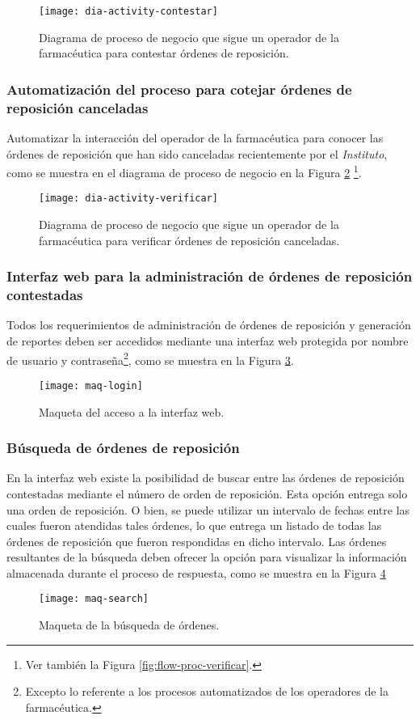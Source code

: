 \begin{figure}[h]
  \centering
  \texttt{[image: dia-activity-contestar]}
  \caption{Diagrama de proceso de negocio que sigue un operador de la farmacéutica para contestar órdenes de reposición.}
  \label{fig:dia-activity-contestar}
\end{figure}

\subsubsection{Automatización del proceso para cotejar órdenes de reposición canceladas}\label{sec:req-verificar}
Automatizar la interacción del operador de la farmacéutica para conocer las órdenes de reposición que han sido canceladas recientemente por el \textit{Instituto}, como se muestra en el diagrama de proceso de negocio en la Figura \ref{fig:dia-activity-verificar} \footnote{
Ver también la Figura \ref{fig:flow-proc-verificar}.}.
\begin{figure}[h]
  \centering
  \texttt{[image: dia-activity-verificar]}
  \caption{Diagrama de proceso de negocio que sigue un operador de la farmacéutica para verificar órdenes de reposición canceladas.}
  \label{fig:dia-activity-verificar}
\end{figure}

\subsubsection{Interfaz web para la administración de órdenes de reposición contestadas}\label{sec:req-web-ui}
Todos los requerimientos de administración de órdenes de reposición y generación de reportes deben ser accedidos mediante una interfaz web protegida por nombre de usuario y contraseña\footnote{Excepto lo referente a los procesos automatizados de los operadores de la farmacéutica.}, como se muestra en la Figura \ref{fig:maq-login}.
\begin{figure}[h]
  \centering
  \texttt{[image: maq-login]} 
  \caption{Maqueta del acceso a la interfaz web.}
  \label{fig:maq-login}
\end{figure} 

\subsubsection{Búsqueda de órdenes de reposición}\label{sec:req-search}
En la interfaz web existe la posibilidad de buscar entre las órdenes de reposición contestadas mediante el número de orden de reposición. Esta opción entrega solo una orden de reposición. O bien, se puede utilizar un intervalo de fechas entre las cuales fueron atendidas tales órdenes, lo que entrega un listado de todas las órdenes de reposición que fueron respondidas en dicho intervalo. Las órdenes resultantes de la búsqueda deben ofrecer la opción para visualizar la información almacenada durante el proceso de respuesta, como se muestra en la Figura \ref{fig:maq-search}
\begin{figure}[h]
  \centering
  \texttt{[image: maq-search]} 
  \caption{Maqueta de la búsqueda de órdenes.}
  \label{fig:maq-search}
\end{figure} 

